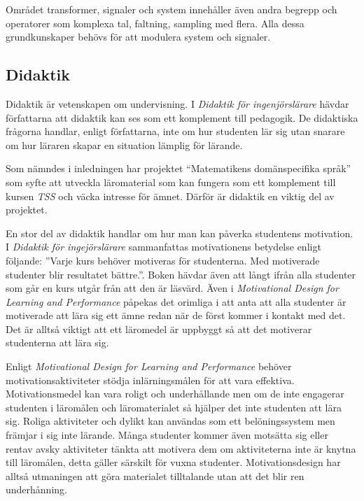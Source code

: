 \documentclass[]{article}
\begin{document}
Området transformer, signaler och system innehåller även andra begrepp och operatorer som komplexa tal, faltning,
sampling med flera.  Alla dessa grundkunskaper behövs för att modulera system och signaler.

\subsection{Didaktik}
Didaktik är vetenskapen om undervisning.
I \textit{Didaktik för ingenjörslärare} hävdar författarna att
didaktik kan ses som ett komplement till pedagogik.
De didaktiska frågorna handlar, enligt författarna,
inte om hur studenten lär sig utan snarare om hur läraren skapar en
situation lämplig för lärande.

Som nämndes i inledningen har projektet “Matematikens domänspecifika språk”
som syfte att utveckla läromaterial som kan fungera som ett komplement till
kursen \textit{TSS} och väcka intresse för ämnet.
Därför är didaktik en viktig del av projektet.

En stor del av didaktik handlar om hur man kan påverka studentens motivation.
I \textit{Didaktik för ingejörslärare} sammanfattas motivationens betydelse
enligt följande: ”Varje kurs behöver motiveras för studenterna.
Med motiverade studenter blir resultatet bättre.”.
Boken hävdar även att långt ifrån alla studenter
som går en kurs utgår från att den är läsvärd.
Även i \textit{Motivational Design for Learning and Performance} påpekas det
orimliga i att anta att alla studenter är motiverade att lära sig ett ämne
redan när de först kommer i kontakt med det.
Det är alltså viktigt att ett läromedel är uppbyggt så att det motiverar
studenterna att lära sig.

Enligt \textit{Motivational Design for Learning and Performance} behöver
motivationsaktiviteter stödja inlärningsmålen för att vara effektiva.
Motivationsmedel kan vara roligt och underhållande men om de inte engagerar
studenten i läromålen och läromaterialet så hjälper det inte studenten att
lära sig. Roliga aktiviteter och dylikt kan användas som ett belöningssystem
men främjar i sig inte lärande. Många studenter kommer även motsätta sig
eller rentav avsky aktiviteter tänkta att motivera dem om aktiviteterna
inte är knytna till läromålen, detta gäller särskilt för vuxna studenter.
Motivationsdesign har alltså utmaningen att göra materialet tilltalande
utan att det blir ren underhånning.
\end{document}

